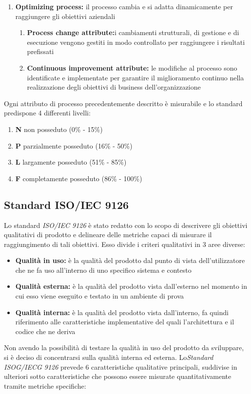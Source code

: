 \documentclass[12pt,a4paper]{article}
\begin{document}
\begin{enumerate}
	\item\textbf{Optimizing process:} il processo cambia e si adatta dinamicamente per raggiungere gli obiettivi aziendali
	\begin{enumerate}
		\item \textbf{Process change attribute:}i cambiamenti strutturali, di gestione e di esecuzione vengono gestiti in modo controllato per raggiungere i risultati prefissati
		\item \textbf{Continuous improvement attribute:} le modifiche al processo sono identificate e implementate per garantire il miglioramento continuo nella realizzazione degli obiettivi di business dell'organizzazione
	\end{enumerate}
\end{enumerate}

Ogni attributo di processo precedentemente descritto è misurabile e lo standard predispone
4 differenti livelli:
\begin{enumerate}
	\item \textbf{N} non posseduto (0\% - 15\%)
	\item \textbf{P} parzialmente posseduto (16\% - 50\%)
	\item \textbf{L} largamente posseduto (51\% - 85\%)
	\item \textbf{F} completamente posseduto (86\% - 100\%)
\end{enumerate}

\subsection{Standard ISO/IEC 9126}
Lo standard \textit{ISO/IEC 9126} è stato redatto con lo scopo di descrivere gli obiettivi
qualitativi di prodotto e delineare delle metriche capaci di misurare il raggiungimento
di tali obiettivi. Esso divide i criteri qualitativi in 3 aree diverse:
\begin{itemize}
	\item \textbf{Qualità in uso:} è la qualità del prodotto   dal punto di vista dell'utilizzatore che ne fa uso all'interno di uno specifico sistema e contesto
	\item \textbf{Qualità esterna:} è la qualità del prodotto   vista dall'esterno nel momento in cui esso viene eseguito e testato in un ambiente di prova
	\item \textbf{Qualità interna:} è la qualità del prodotto   vista dall'interno, fa quindi riferimento alle caratteristiche implementative del   quali l'architettura e il codice che ne deriva
\end{itemize}
Non avendo la possibilità di testare la qualità in uso del prodotto   da sviluppare, si è deciso di concentrarsi sulla qualità interna ed esterna. Lo\textit{Standard ISOG/IECG 9126}
prevede 6 caratteristiche qualitative principali, suddivise in ulteriori sotto caratteristiche
che possono essere misurate quantitativamente tramite metriche specifiche:
\end{document}
